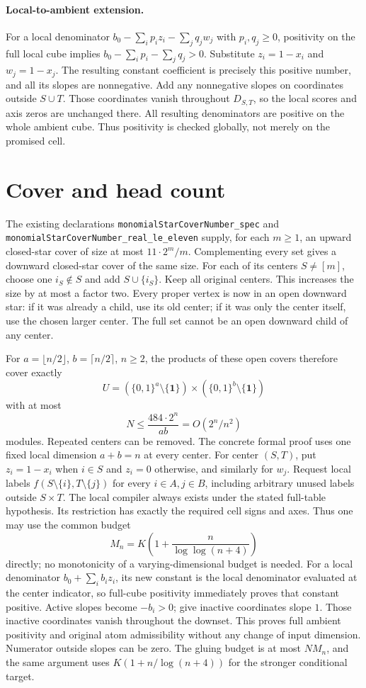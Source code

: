 \documentclass[11pt]{article}
\begin{document}
\paragraph{Local-to-ambient extension.}
For a local denominator $b_0-\sum_i p_i z_i-\sum_jq_jw_j$ with
$p_i,q_j\geq0$, positivity on the full local cube implies
$b_0-\sum_ip_i-\sum_jq_j>0$. Substitute $z_i=1-x_i$ and $w_j=1-x_j$.
The resulting constant coefficient is precisely this positive number,
and all its slopes are nonnegative. Add any nonnegative slopes on
coordinates outside $S\cup T$. Those coordinates vanish throughout
$D_{S,T}$, so the local scores and axis zeros are unchanged there.
All resulting denominators are positive on the whole ambient cube.
Thus positivity is checked globally, not merely on the promised cell.

\section{Cover and head count}
The existing declarations \texttt{monomialStarCoverNumber\_spec} and
\texttt{monomialStarCoverNumber\_real\_le\_eleven} supply, for each
$m\geq1$, an upward closed-star cover of size at most $11\cdot2^m/m$.
Complementing every set gives a downward closed-star cover of the same
size. For each of its centers $S\ne[m]$, choose one $i_S\notin S$
and add $S\cup\{i_S\}$. Keep all original centers. This increases
the size by at most a factor two. Every proper vertex is now in an
open downward star: if it was already a child, use its old center;
if it was only the center itself, use the chosen larger center.
The full set cannot be an open downward child of any center.

For $a=\lfloor n/2\rfloor$, $b=\lceil n/2\rceil$, $n\geq2$, the
products of these open covers therefore cover exactly
\[
U=(\{0,1\}^a\setminus\{\mathbf1\})
\times(\{0,1\}^b\setminus\{\mathbf1\})
\]
with at most
\[
N\leq\frac{484\cdot2^n}{ab}=O(2^n/n^2)
\]
modules. Repeated centers can be removed. The concrete formal proof uses
one fixed local dimension $a+b=n$ at every center. For center $(S,T)$,
put $z_i=1-x_i$ when $i\in S$ and $z_i=0$ otherwise, and similarly for
$w_j$. Request local labels $f(S\setminus\{i\},T\setminus\{j\})$
for every $i\in A,j\in B$, including arbitrary unused labels outside
$S\times T$. The local compiler always exists under the stated full-table
hypothesis. Its restriction has exactly the required cell signs and axes.
Thus one may use the common budget
\[
M_n=K\left(1+\frac{n}{\log\log(n+4)}\right)
\]
directly; no monotonicity of a varying-dimensional budget is needed.
For a local denominator $b_0+\sum_i b_i z_i$, its new constant is the
local denominator evaluated at the center indicator, so full-cube
positivity immediately proves that constant positive. Active slopes
become $-b_i>0$; give inactive coordinates slope $1$. Those inactive
coordinates vanish throughout the downset. This proves full ambient
positivity and original atom admissibility without any change of input
dimension. Numerator outside slopes can be zero.
The gluing budget is at most $NM_n$, and the same argument uses
$K(1+n/\log(n+4))$ for the stronger conditional target.
\end{document}

